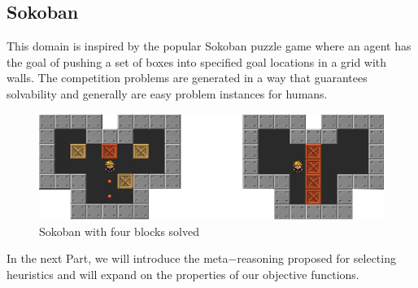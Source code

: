 \subsection{Sokoban}
This domain is inspired by the popular Sokoban puzzle game where an agent has the goal of pushing a set of boxes into specified goal locations in a grid with walls. The competition problems are generated in a way that guarantees solvability and generally are easy problem instances for humans.


\begin{figure}[!htb]
\begin{center}
  \includegraphics[width=12cm,scale=0.5]{images/sokoban_star_end}
\end{center}
\caption{Sokoban with four blocks solved}\label{fig:img_sokoban_solved}
\end{figure}




\bigskip

In the next Part, we will introduce the meta$-$reasoning proposed for selecting heuristics and will expand on the properties of our objective functions.\\

\clearpage